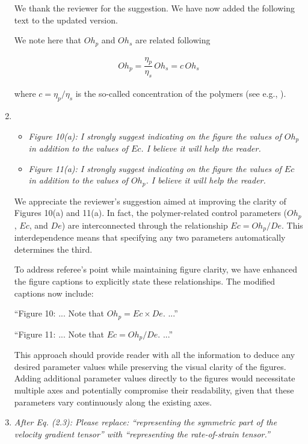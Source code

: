 \documentclass[]{article}
\newcommand{\oo}{\color{magenta} \normalfont}
\newcommand{\bb}{\color{black} \normalfont}
\begin{document}
\begin{enumerate}
We thank the reviewer for the suggestion. We have now added the following text to the updated version.

\oo We note here that $Oh_p$ and $Oh_s$ are related following

\begin{align}
	Oh_p = \dfrac{\eta_p}{\eta_s} \, Oh_s = c\,Oh_s
\end{align}

\noindent where $c = \eta_p/\eta_s$ is the so-called concentration of the polymers (see e.g., \citet{remmelgas1999computational, hinch2024fast}). \bb

\item \begin{itemize}
	\item \textit{Figure 10(a): I strongly suggest indicating on the figure the values of $Oh_p$ in addition to the values of $Ec$. I believe it will help the reader.}
	\item \textit{Figure 11(a): I strongly suggest indicating on the figure the values of $Ec$ in addition to the values of $Oh_p$. I believe it will help the reader.}
\end{itemize}

We appreciate the reviewer's suggestion aimed at improving the clarity of Figures 10(a) and 11(a). In fact, the polymer-related control parameters ($Oh_p$, $Ec$, and $De$) are interconnected through the relationship $Ec = Oh_p/De$. This interdependence means that specifying any two parameters automatically determines the third.

To address referee's point while maintaining figure clarity, we have enhanced the figure captions to explicitly state these relationships. The modified captions now include:


``Figure 10: ... {\oo Note that $Oh_p = Ec\times De$. \bb} ...''

``Figure 11: ... {\oo Note that $Ec = Oh_p/De$. \bb} ...''

This approach should provide reader with all the information to deduce any desired parameter values while preserving the visual clarity of the figures. Adding additional parameter values directly to the figures would necessitate multiple axes and potentially compromise their readability, given that these parameters vary continuously along the existing axes.


\item \textit{After Eq. (2.3): Please replace: “representing the symmetric part of the velocity
gradient tensor” with “representing the rate-of-strain tensor.”}


\end{enumerate}
\end{document}
